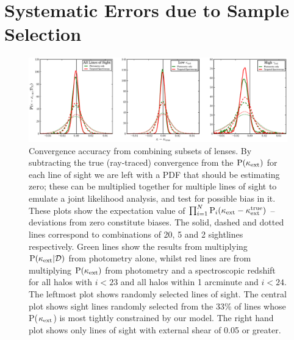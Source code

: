 \documentclass[useAMS,usenatbib]{mn2e}
\begin{document}


\section{Systematic Errors due to Sample Selection}
\label{sec:biases}

\begin{figure}
\includegraphics[width=\textwidth]{figs/biasplots.eps}
\caption{Convergence accuracy from combining subsets of
lenses. By subtracting the true (ray-traced) convergence from the
\infered ${\rm P}(\kappa_{\rm ext})$ for each line of sight we are left with a PDF that
should be estimating zero; these can be multiplied together for multiple
lines of sight to emulate a joint likelihood analysis, and 
test for possible bias in it. These plots show the
expectation value of $\prod_{i=1}^N {\rm P}_i(\kappa_{\rm ext}-\kappa_{\rm ext}^{\rm true})$ --
deviations from zero constitute biases. The solid, dashed and dotted
lines correspond to combinations of 
20, 5 and 2 sightlines respectively. Green lines show the results
from multiplying ${\rm P}(\kappa_{\rm ext}|{\mathcal{D}})$ \infered from photometry alone, whilst red
lines are from multiplying ${\rm P}(\kappa_{\rm ext})$ \infered from photometry and a
spectroscopic redshift for all halos with $i<23$ and all halos within 1
arcminute and $i<24$. The leftmost plot shows randomly selected lines
of sight. The central plot shows sight lines randomly selected from the
33\% of lines whose P($\kappa_{\rm ext}$) is most tightly constrained by our model. The right
hand plot shows only lines of sight with external shear of 0.05 or
greater.}
\label{fig:biasplots}
\end{figure}
\end{document}
